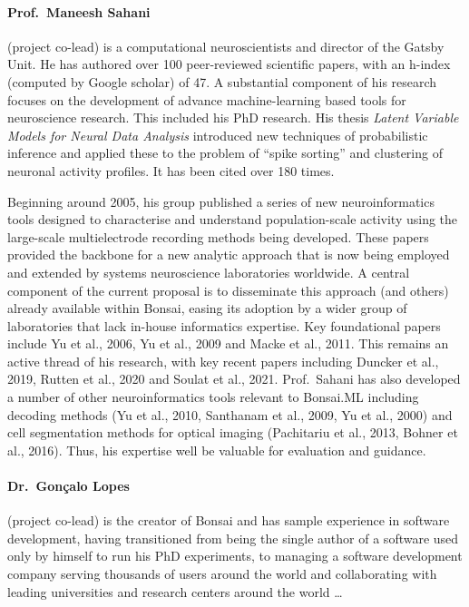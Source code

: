 \paragraph{Prof.~Maneesh Sahani} (project co-lead) is a computational
neuroscientists and director of the Gatsby Unit. He has authored over 100
peer-reviewed scientific papers, with an h-index (computed by Google scholar)
of 47. A substantial component of his research focuses on the development of
advance machine-learning based tools for neuroscience research. This included
his PhD research. His thesis \textit{Latent Variable Models for Neural Data
Analysis} introduced new techniques of probabilistic inference and applied
these to the problem of “spike sorting” and clustering of neuronal activity
profiles. It has been cited over 180 times.

Beginning around 2005, his group published a series of new neuroinformatics
tools designed to characterise and understand population-scale activity using
the large-scale multielectrode recording methods being developed. These papers
provided the backbone for a new analytic approach that is now being employed
and extended by systems neuroscience laboratories worldwide. A central
component of the current proposal is to disseminate this approach (and others)
already available within Bonsai, easing its adoption by a wider group of
laboratories that lack in-house informatics expertise. Key foundational papers
include Yu et al., 2006, Yu et al., 2009 and Macke et al., 2011.
%
This remains an active thread of his research, with key recent papers including
Duncker et al., 2019, Rutten et al., 2020 and Soulat et al., 2021.
%
Prof.~Sahani has also developed a number of other neuroinformatics tools
relevant to Bonsai.ML including decoding methods (Yu et al., 2010, Santhanam et
al., 2009, Yu et al., 2000) and cell segmentation methods for optical imaging
(Pachitariu et al., 2013, Bohner et al., 2016). Thus, his expertise well be
valuable for evaluation and guidance.

\paragraph{Dr.~Gon\c{c}alo Lopes} (project co-lead) is the creator of Bonsai and
has sample experience in software development, having transitioned from being
the single author of a software used only by himself to run his PhD
experiments, to managing a software development company serving thousands of
users around the world and collaborating with leading universities and research
centers around the world \ldots

